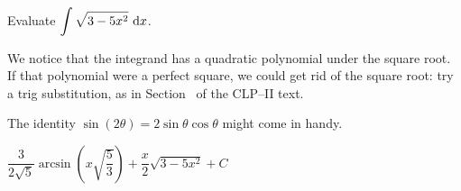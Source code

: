 \begin{question} Evaluate
$\displaystyle\int \sqrt{3-5x^2}~\mathrm{d}x$.
\end{question}

\begin{hint}
We notice that the integrand has a quadratic polynomial under the square root. If that polynomial were a perfect square, we could get rid of the square root:
try a trig substitution, as in Section~ of the CLP--II text.

The identity $\sin(2\theta)=2\sin\theta\cos\theta$ might come in handy.
\end{hint}

\begin{answer}
$\dfrac{3}{2\sqrt{5}}
\arcsin\left(x\sqrt{\dfrac{5}{3}}\right) + \dfrac{x}{2}\sqrt{3-5x^2}
+C$
\end{answer}

